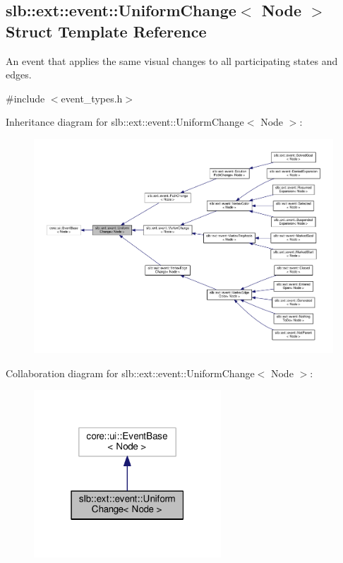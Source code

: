 \hypertarget{structslb_1_1ext_1_1event_1_1UniformChange}{}\subsection{slb\+:\+:ext\+:\+:event\+:\+:Uniform\+Change$<$ Node $>$ Struct Template Reference}
\label{structslb_1_1ext_1_1event_1_1UniformChange}


An event that applies the same visual changes to all participating states and edges.  




{\ttfamily \#include $<$event\+\_\+types.\+h$>$}



Inheritance diagram for slb\+:\+:ext\+:\+:event\+:\+:Uniform\+Change$<$ Node $>$\+:\nopagebreak
\begin{figure}[H]
\begin{center}
\leavevmode
\includegraphics[width=350pt]{structslb_1_1ext_1_1event_1_1UniformChange__inherit__graph}
\end{center}
\end{figure}


Collaboration diagram for slb\+:\+:ext\+:\+:event\+:\+:Uniform\+Change$<$ Node $>$\+:\nopagebreak
\begin{figure}[H]
\begin{center}
\leavevmode
\includegraphics[width=199pt]{structslb_1_1ext_1_1event_1_1UniformChange__coll__graph}
\end{center}
\end{figure}
